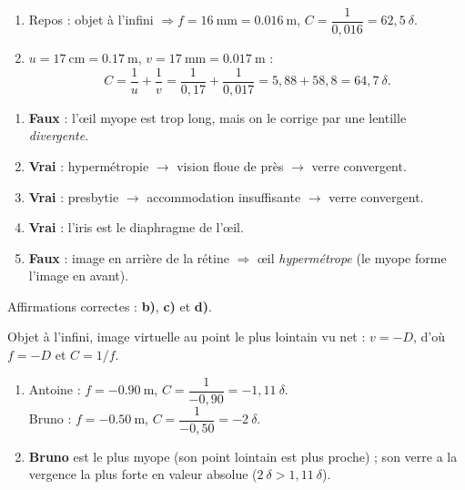 \documentclass[11pt,a4paper]{article}
\begin{document}

\begin{corrige}
\begin{enumerate}[label=\alph*)]
  \item Repos : objet à l'infini $\Rightarrow f=\qty{16}{\mm}=\qty{0.016}{\m}$,
        $C=\dfrac{1}{0,016}=62{,}5~\delta$.
  \item $u=\qty{17}{\cm}=\qty{0.17}{\m}$, $v=\qty{17}{\mm}=\qty{0.017}{\m}$ :
        \[ C=\frac{1}{u}+\frac{1}{v}=\frac{1}{0,17}+\frac{1}{0,017}=5{,}88+58{,}8=64{,}7~\delta. \]
\end{enumerate}
\end{corrige}

\begin{corrige}
\begin{enumerate}[label=\alph*)]
  \item \textbf{Faux} : l'\oe il myope est trop long, mais on le corrige par une lentille
        \emph{divergente}.
  \item \textbf{Vrai} : hypermétropie $\to$ vision floue de près $\to$ verre convergent.
  \item \textbf{Vrai} : presbytie $\to$ accommodation insuffisante $\to$ verre convergent.
  \item \textbf{Vrai} : l'iris est le diaphragme de l'\oe il.
  \item \textbf{Faux} : image en arrière de la rétine $\Rightarrow$ \oe il \emph{hypermétrope}
        (le myope forme l'image en avant).
\end{enumerate}
Affirmations correctes : \textbf{b)}, \textbf{c)} et \textbf{d)}.
\end{corrige}

\begin{corrige}
Objet à l'infini, image virtuelle au point le plus lointain vu net : $v=-D$, d'où $f=-D$ et $C=1/f$.
\begin{enumerate}[label=\alph*)]
  \item Antoine : $f=-\qty{0.90}{\m}$, $C=\dfrac{1}{-0,90}=-1{,}11~\delta$.\\
        Bruno : $f=-\qty{0.50}{\m}$, $C=\dfrac{1}{-0,50}=-2~\delta$.
  \item \textbf{Bruno} est le plus myope (son point lointain est plus proche) ; son verre a la
        vergence la plus forte en valeur absolue ($2~\delta > 1{,}11~\delta$).
\end{enumerate}
\end{corrige}
\end{document}
